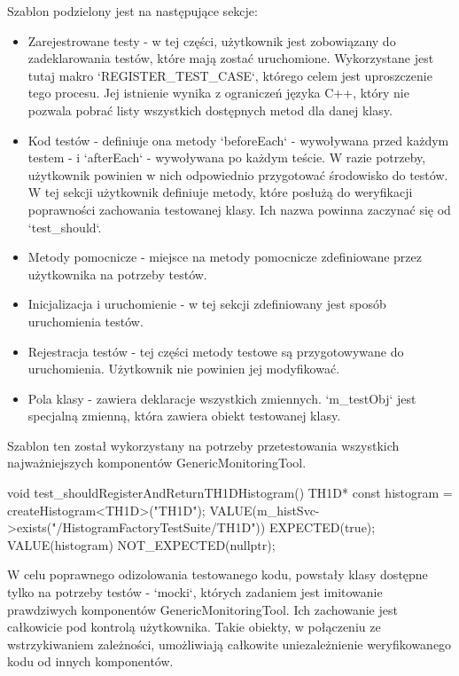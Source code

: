 Szablon podzielony jest na następujące sekcje:
\begin{itemize}
\item Zarejestrowane testy - w tej części, użytkownik jest zobowiązany do zadeklarowania testów, które mają zostać uruchomione. Wykorzystane jest tutaj makro `REGISTER\_TEST\_CASE`, którego celem jest uproszczenie tego procesu. Jej istnienie wynika z ograniczeń języka C++, który nie pozwala pobrać listy wszystkich dostępnych metod dla danej klasy.
\item Kod testów - definiuje ona metody `beforeEach` - wywoływana przed każdym testem - i `afterEach` - wywoływana po każdym teście. W razie potrzeby, użytkownik powinien w nich odpowiednio przygotować środowisko do testów. W tej sekcji użytkownik definiuje metody, które posłużą do weryfikacji poprawności zachowania testowanej klasy. Ich nazwa powinna zaczynać się od `test\_should`.
\item Metody pomocnicze - miejsce na metody pomocnicze zdefiniowane przez użytkownika na potrzeby testów.
\item Inicjalizacja i uruchomienie - w tej sekcji zdefiniowany jest sposób uruchomienia testów.
\item Rejestracja testów - tej części metody testowe są przygotowywane do uruchomienia. Użytkownik nie powinien jej modyfikować.  
\item Pola klasy - zawiera deklaracje wszystkich zmiennych. `m\_testObj` jest specjalną zmienną, która zawiera obiekt testowanej klasy.  
\end{itemize}

Szablon ten został wykorzystany na potrzeby przetestowania wszystkich najważniejszych komponentów GenericMonitoringTool.

\begin{cpp}[caption=Jeden z testów zdefiniowanych w ramach HistogramFactoryTestSuite~\cite{histogram-factory-test-suite}, label={lst:athena:histogram_factory_test_suite}]
void test_shouldRegisterAndReturnTH1DHistogram() {
   TH1D* const histogram = createHistogram<TH1D>("TH1D");
   VALUE(m_histSvc->exists("/HistogramFactoryTestSuite/TH1D")) EXPECTED(true);
   VALUE(histogram) NOT_EXPECTED(nullptr);
}
\end{cpp}

W celu poprawnego odizolowania testowanego kodu, powstały klasy dostępne tylko na potrzeby testów - `mocki`, których zadaniem jest imitowanie prawdziwych komponentów GenericMonitoringTool.
Ich zachowanie jest całkowicie pod kontrolą użytkownika.
Takie obiekty, w połączeniu ze wstrzykiwaniem zależności, umożliwiają całkowite uniezależnienie weryfikowanego kodu od innych komponentów.
